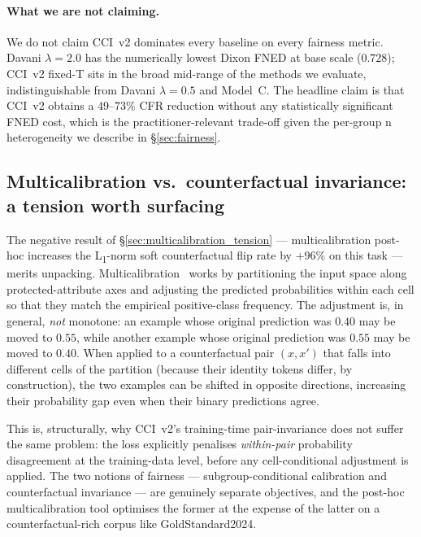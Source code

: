 \documentclass[10pt,a4paper]{article}
\begin{document}
\paragraph{What we are not claiming.}
We do not claim CCI~v2 dominates every baseline on every fairness metric. Davani $\lambda=2.0$ has the numerically lowest Dixon FNED at base scale ($0.728$); CCI~v2 fixed-T sits in the broad mid-range of the methods we evaluate, indistinguishable from Davani $\lambda=0.5$ and Model~C. The headline claim is that CCI~v2 obtains a 49--73\% CFR reduction without any statistically significant FNED cost, which is the practitioner-relevant trade-off given the per-group n heterogeneity we describe in \S\ref{sec:fairness}.

\subsection{Multicalibration vs.\ counterfactual invariance: a tension worth surfacing}
\label{sec:disc_multicalibration}

The negative result of \S\ref{sec:multicalibration_tension} --- multicalibration post-hoc increases the L\textsubscript{1}-norm soft counterfactual flip rate by $+96\%$ on this task --- merits unpacking. Multicalibration~\citep{hebertjohnson2018multicalibration} works by partitioning the input space along protected-attribute axes and adjusting the predicted probabilities within each cell so that they match the empirical positive-class frequency. The adjustment is, in general, \emph{not} monotone: an example whose original prediction was $0.40$ may be moved to $0.55$, while another example whose original prediction was $0.55$ may be moved to $0.40$. When applied to a counterfactual pair $(x, x')$ that falls into different cells of the partition (because their identity tokens differ, by construction), the two examples can be shifted in opposite directions, increasing their probability gap even when their binary predictions agree.

This is, structurally, why CCI~v2's training-time pair-invariance does not suffer the same problem: the loss explicitly penalises \emph{within-pair} probability disagreement at the training-data level, before any cell-conditional adjustment is applied. The two notions of fairness --- subgroup-conditional calibration and counterfactual invariance --- are genuinely separate objectives, and the post-hoc multicalibration tool optimises the former at the expense of the latter on a counterfactual-rich corpus like GoldStandard2024.
\end{document}

